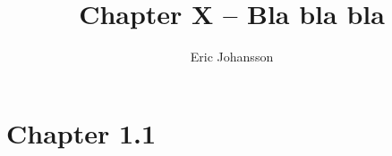 \documentclass{article}
\title{Chapter X -- Bla bla bla}
\author{Eric Johansson}
\begin{document}
\maketitle
\newpage
\tableofcontents
\newpage
\section{Chapter 1.1} 

    
\end{document}
